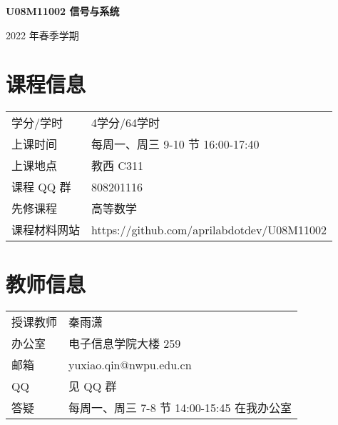 \documentclass[letterpaper]{article}
\def\name{\textbf{U08M11002 信号与系统}}
\begin{document}
{\huge \name}


\vspace{0.1in}

\begin{minipage}{0.8\linewidth}
	2022 年春季学期
\end{minipage}


\section*{\textsc{课程信息}}
\begin{tabular}{ll}
学分/学时 & 4学分/64学时 \vspace{.5em}\\
上课时间 & 	每周一、周三 9-10 节 16:00-17:40 \vspace{.5em}\\
上课地点 &	教西 C311 \vspace{.5em}\\
课程 QQ 群 & 808201116  \vspace{.5em}\\
先修课程 & 高等数学 \vspace{.5em}\\
课程材料网站 & https://github.com/aprilabdotdev/U08M11002 \vspace{.5em}\\
\end{tabular}


\section*{\textsc{教师信息}}
\begin{tabular}{ll}
授课教师 & 	秦雨潇 \vspace{.5em}\\
办公室 &	电子信息学院大楼 259 \vspace{.5em}\\
邮箱 & yuxiao.qin@nwpu.edu.cn  \vspace{.5em}\\
QQ & 见 QQ 群 \vspace{.5em}\\
答疑 & 每周一、周三 7-8 节 14:00-15:45 在我办公室 \vspace{.5em}\\
\end{tabular}
\end{document}
